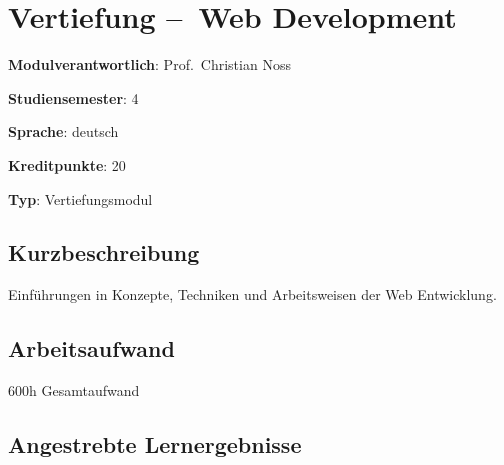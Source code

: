 \hypertarget{vertiefung-web-developmentpathlabelmi-2017modulbeschreibungen-bachelorba_vertiefung-web_development}{%
\chapter{Vertiefung --~Web
Development\label{/mi-2017/modulbeschreibungen-bachelor/BA_Vertiefung-Web_Development}}\label{vertiefung-web-developmentpathlabelmi-2017modulbeschreibungen-bachelorba_vertiefung-web_development}}

\begin{modulHead}
\textbf{Modulverantwortlich}: Prof.~Christian
Noss
\end{modulHead}
\begin{modulHead}
\textbf{Studiensemester}:
4
\end{modulHead}
\begin{modulHead}
\textbf{Sprache}:
deutsch
\end{modulHead}
\begin{modulHead}
\textbf{Kreditpunkte}:
20
\end{modulHead}
\begin{modulHead}
\textbf{Typ}:
Vertiefungsmodul
\end{modulHead}


\hypertarget{kurzbeschreibungpathlabelmi-2017modulbeschreibungen-bachelorba_vertiefung-web_development}{%
\section*{Kurzbeschreibung\label{/mi-2017/modulbeschreibungen-bachelor/BA_Vertiefung-Web_Development}}\label{kurzbeschreibungpathlabelmi-2017modulbeschreibungen-bachelorba_vertiefung-web_development}}

Einführungen in Konzepte, Techniken und Arbeitsweisen der Web
Entwicklung.

\hypertarget{arbeitsaufwandpathlabelmi-2017modulbeschreibungen-bachelorba_vertiefung-web_development}{%
\section*{Arbeitsaufwand\label{/mi-2017/modulbeschreibungen-bachelor/BA_Vertiefung-Web_Development}}\label{arbeitsaufwandpathlabelmi-2017modulbeschreibungen-bachelorba_vertiefung-web_development}}

600h Gesamtaufwand

\hypertarget{angestrebte-lernergebnissepathlabelmi-2017modulbeschreibungen-bachelorba_vertiefung-web_development}{%
\section*{Angestrebte
Lernergebnisse\label{/mi-2017/modulbeschreibungen-bachelor/BA_Vertiefung-Web_Development}}\label{angestrebte-lernergebnissepathlabelmi-2017modulbeschreibungen-bachelorba_vertiefung-web_development}}


